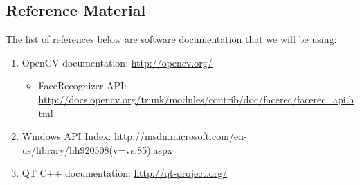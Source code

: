 \documentclass[titlepage]{article}
\begin{document}
\subsection{Reference Material}
The list of references below are software documentation that we will be using:
\begin{enumerate}
	\item OpenCV documentation: \href{http://opencv.org/}{\color{blue} http://opencv.org/}
	\begin{itemize}
		\item FaceRecognizer API: \href{http://docs.opencv.org/trunk/modules/contrib/doc/facerec/facerec\_api.html}{\color{blue} http://docs.opencv.org/trunk/modules/contrib/doc/facerec/facerec\_api.html}
	\end{itemize}
	\item Windows API Index: \href{http://msdn.microsoft.com/en-us/library/hh920508(v=vs.85).aspx}{\color{blue} http://msdn.microsoft.com/en-us/library/hh920508(v=vs.85).aspx}
	\item QT C++ documentation: \href{http://qt-project.org/}{\color{blue} http://qt-project.org/}
\end{enumerate}
\end{document}
